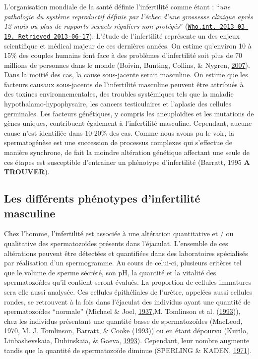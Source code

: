 \documentclass[12pt,twoside]{reedthesis}
\theoremstyle{definition}
\theoremstyle{definition}
\theoremstyle{remark}
\begin{document}
  L'organisation mondiale de la santé définie l'infertilité comme étant :
  ``\emph{une pathologie du système reproductif définie par l'échec d'une
  grossesse clinique après 12 mois ou plus de rapports sexuels réguliers
  non protégés}''
  (\href{http://www.who.int/reproductivehealth/topics/infertility/definitions/en/}{\texttt{Who.int.\ 2013-03-19.\ Retrieved\ 2013-06-17}}).
  L'étude de l'infertilité représente un des enjeux scientifique et
  médical majeur de ces dernières années. On estime qu'environ 10 à 15\%
  des couples humains font face à des problèmes d'infertilité soit plus de
  70 millions de personnes dans le monde (Boivin, Bunting, Collins, \&
  Nygren, \protect\hyperlink{ref-Boivin2007a}{2007}). Dans la moitié des
  cas, la cause sous-jacente serait masculine. On estime que les facteurs
  causaux sous-jacents de l'infertilité masculine peuvent être attribués à
  des toxines environnementales, des troubles systémiques tels que la
  maladie hypothalamo-hypophysaire, les cancers testiculaires et l'aplasie
  des cellules germinales. Les facteurs génétiques, y compris les
  aneuploïdies et les mutations de gènes uniques, contribuent également à
  l'infertilité masculine. Cependant, aucune cause n'est identifiée dans
  10-20\% des cas. Comme nous avons pu le voir, la spermatogénèse est une
  succession de processus complexes qui s'effectue de manière synchrone,
  de fait la moindre altération génétique affectant une seule de ces
  étapes est susceptible d'entrainer un phénotype d'infertilité (Barratt,
  1995 \textbf{A TROUVER}).
  
  \subsection{Les différents phénotypes d'infertilité
  masculine}\label{les-differents-phenotypes-dinfertilite-masculine}
  
  Chez l'homme, l'infertilité est associée à une altération quantitative
  et / ou qualitative des spermatozoïdes présents dans l'éjaculat.
  L'ensemble de ces altérations peuvent être détectées et quantifiées dans
  des laboratoires spécialisés par réalisation d'un spermogramme. Au cours
  de celui-ci, plusieurs critères tel que le volume de sperme sécrété, son
  pH, la quantité et la vitalité des spermatozoïdes qu'il contient seront
  évalués. La proportion de cellules immatures sera elle aussi analysée.
  Ces cellules épithéliales de l'urètre, appelées aussi cellules rondes,
  se retrouvent à la fois dans l'éjaculat des individus ayant une quantité
  de spermatozoïdes ``normale'' (Michael \& Joel,
  \protect\hyperlink{ref-Michael1937}{1937},M. Tomlinson et al.
  (\protect\hyperlink{ref-Tomlinson1993a}{1993})), chez les individus
  présentant une quantité basse de spermatozoïdes (MacLeod,
  \protect\hyperlink{ref-MacLeod1970}{1970}, M. J. Tomlinson, Barratt, \&
  Cooke (\protect\hyperlink{ref-Tomlinson1993}{1993})) ou en étant
  dépourvu (Kurilo, Liubashevskaia, Dubinskaia, \& Gaeva,
  \protect\hyperlink{ref-Kurilo}{1993}). Cependant, leur nombre augmente
  tandis que la quantité de spermatozoïde diminue (SPERLING \& KADEN,
  \protect\hyperlink{ref-SPERLING1971}{1971}).
  
\end{document}
